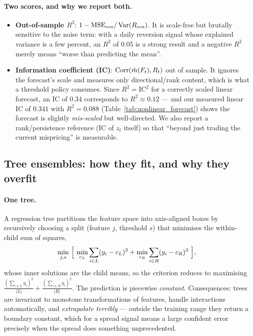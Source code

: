 \paragraph{Two scores, and why we report both.}
\begin{itemize}
  \item \textbf{Out-of-sample $R^2$}: $1-\mathrm{MSE}_{\text{oos}}/\operatorname{Var}(R_{\text{oos}})$.
    It is scale-free but brutally sensitive to the noise term: with a daily reversion
    signal whose explained variance is a few percent, an $R^2$ of $0.05$ is a strong
    result and a negative $R^2$ merely means ``worse than predicting the mean''.
  \item \textbf{Information coefficient (IC)}: $\operatorname{Corr}(\hat m(F_t), R_t)$ out of sample.
    It ignores the forecast's scale and measures only directional/rank content, which is
    what a threshold policy consumes. Since $R^2 = \mathrm{IC}^2$ for a correctly scaled
    linear forecast, an IC of $0.34$ corresponds to $R^2\approx0.12$ --- and our measured
    linear IC of $0.341$ with $R^2=0.088$ (Table~\ref{tab:nonlinear_forecast}) shows the
    forecast is slightly \emph{mis-scaled} but well-directed. We also report a
    rank/persistence reference (IC of $z_t$ itself) so that ``beyond just trading the
    current mispricing'' is measurable.
\end{itemize}

\subsection{Tree ensembles: how they fit, and why they overfit}
\label{sec:nonlinear:trees}

\paragraph{One tree.} A regression tree partitions the feature space into axis-aligned
boxes by recursively choosing a split (feature $j$, threshold $s$) that minimises the
within-child sum of squares,
\begin{equation}
  \min_{j,s}\ \Bigl[\ \min_{c_L}\sum_{i\in L}(y_i-c_L)^2 + \min_{c_R}\sum_{i\in R}(y_i-c_R)^2\ \Bigr],
  \label{eq:tree:split}
\end{equation}
whose inner solutions are the child means, so the criterion reduces to maximising
$\frac{(\sum_{i\in L}y_i)^2}{\lvert L\rvert}+\frac{(\sum_{i\in R}y_i)^2}{\lvert R\rvert}$.
The prediction is piecewise \emph{constant}. Consequences: trees are invariant to
monotone transformations of features, handle interactions automatically, and
\emph{extrapolate terribly} --- outside the training range they return a boundary
constant, which for a spread signal means a large confident error precisely when the
spread does something unprecedented.

